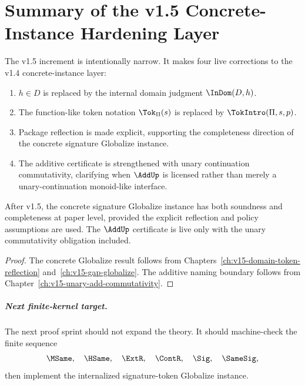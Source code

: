 \chapter{Summary of the v1.5 Concrete-Instance Hardening Layer}

The v1.5 increment is intentionally narrow. It makes four live corrections to the v1.4 concrete-instance layer:

\begin{enumerate}
  \item \(h\in D\) is replaced by the internal domain judgment \(\InDom(D,h)\).
  \item The function-like token notation \(\Tok_{\Pi}(s)\) is replaced by \(\TokIntro(\Pi,s,p)\).
  \item Package reflection is made explicit, supporting the completeness direction of the concrete signature Globalize instance.
  \item The additive certificate is strengthened with unary continuation commutativity, clarifying when \(\AddUp\) is licensed rather than merely a unary-continuation monoid-like interface.
\end{enumerate}

\begin{corollary}
After v1.5, the concrete signature Globalize instance has both soundness and completeness at paper level, provided the explicit reflection and policy assumptions are used. The \(\AddUp\) certificate is live only with the unary commutativity obligation included.
\end{corollary}

\begin{proof}
The concrete Globalize result follows from Chapters~\ref{ch:v15-domain-token-reflection} and~\ref{ch:v15-gap-globalize}. The additive naming boundary follows from Chapter~\ref{ch:v15-unary-add-commutativity}.
\end{proof}

\paragraph{Next finite-kernel target.}
The next proof sprint should not expand the theory. It should machine-check the finite sequence
\[
  \MSame,\quad \HSame,\quad \ExtR,\quad \ContR,\quad \Sig,\quad \SameSig,
\]
then implement the internalized signature-token Globalize instance.
